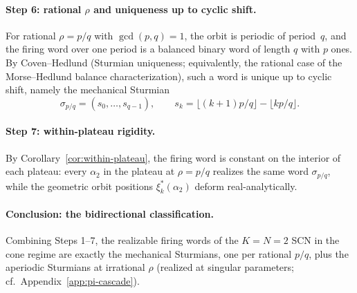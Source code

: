\documentclass[12pt]{article}
\begin{document}
\paragraph{Step 6: rational $\rho$ and uniqueness up to cyclic shift.}
For rational $\rho=p/q$ with $\gcd(p,q)=1$, the orbit is periodic of period~$q$, and the firing word over one period is a balanced binary word of length $q$ with $p$ ones. By Coven--Hedlund \citeyearpar{coven1973sequences} (Sturmian uniqueness; equivalently, the rational case of the Morse--Hedlund balance characterization), such a word is unique up to cyclic shift, namely the mechanical Sturmian
\[
    \sigma_{p/q}=(s_0,\ldots,s_{q-1}), \qquad s_k=\lfloor(k{+}1)p/q\rfloor-\lfloor kp/q\rfloor.
\]

\paragraph{Step 7: within-plateau rigidity.}
By Corollary~\ref{cor:within-plateau}, the firing word is constant on the interior of each plateau: every $\alpha_2$ in the plateau at $\rho=p/q$ realizes the same word $\sigma_{p/q}$, while the geometric orbit positions $\xi_k^*(\alpha_2)$ deform real-analytically.

\paragraph{Conclusion: the bidirectional classification.}
Combining Steps 1--7, the realizable firing words of the $K{=}N{=}2$ SCN in the cone regime are exactly the mechanical Sturmians, one per rational $p/q$, plus the aperiodic Sturmians at irrational $\rho$ (realized at singular parameters; cf.~Appendix~\ref{app:pi-cascade}).
\end{document}
